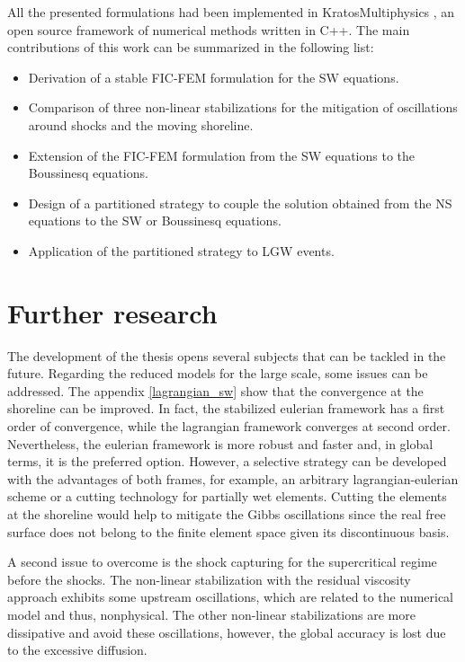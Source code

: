 All the presented formulations had been implemented in KratosMultiphysics \cite{dadvand2010, dadvand2013}, an open source framework of numerical methods written in C++. The main contributions of this work can be summarized in the following list:

\begin{itemize}
    \item Derivation of a stable FIC-FEM formulation for the SW equations.
    \item Comparison of three non-linear stabilizations for the mitigation of oscillations around shocks and the moving shoreline.
    \item Extension of the FIC-FEM formulation from the SW equations to the Boussinesq equations.
    \item Design of a partitioned strategy to couple the solution obtained from the NS equations to the SW or Boussinesq equations.
    \item Application of the partitioned strategy to LGW events.
\end{itemize}



\section{Further research}


The development of the thesis opens several subjects that can be tackled in the future.
Regarding the reduced models for the large scale, some issues can be addressed. The appendix \ref{lagrangian_sw} show that the convergence at the shoreline can be improved. In fact, the stabilized eulerian framework has a first order of convergence, while the lagrangian framework converges at second order. Nevertheless, the eulerian framework is more robust and faster and, in global terms, it is the preferred option. However, a selective strategy can be developed with the advantages of both frames, for example, an arbitrary lagrangian-eulerian scheme or a cutting technology for partially wet elements. Cutting the elements at the shoreline would help to mitigate the Gibbs oscillations since the real free surface does not belong to the finite element space given its discontinuous basis.

A second issue to overcome is the shock capturing for the supercritical regime before the shocks. The non-linear stabilization with the residual viscosity approach exhibits some upstream oscillations, which are related to the numerical model and thus, nonphysical. The other non-linear stabilizations are more dissipative and avoid these oscillations, however, the global accuracy is lost due to the excessive diffusion.

